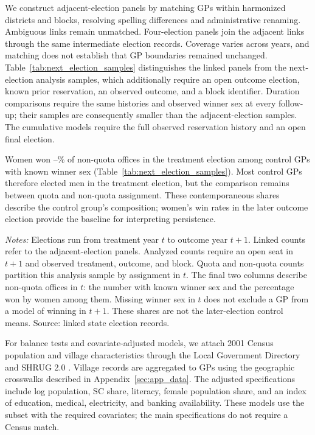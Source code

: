 \documentclass[11pt]{article}
\begin{document}
We construct adjacent-election panels by matching GPs within harmonized districts and blocks, resolving spelling differences and administrative renaming. Ambiguous links remain unmatched. Four-election panels join the adjacent links through the same intermediate election records. Coverage varies across years, and matching does not establish that GP boundaries remained unchanged. Table~\ref{tab:next_election_samples} distinguishes the linked panels from the next-election analysis samples, which additionally require an open outcome election, known prior reservation, an observed outcome, and a block identifier. Duration comparisons require the same histories and observed winner sex at every follow-up; their samples are consequently smaller than the adjacent-election samples. The cumulative models require the full observed reservation history and an open final election.

Women won \controlPriorWomenMin{}--\controlPriorWomenMax{}\% of non-quota offices in the treatment election among control GPs with known winner sex (Table~\ref{tab:next_election_samples}). Most control GPs therefore elected men in the treatment election, but the comparison remains between quota and non-quota assignment. These contemporaneous shares describe the control group's composition; women's win rates in the later outcome election provide the baseline for interpreting persistence.

\begin{table}[!htbp]
\centering\small
\caption{Next-election samples and women elected without quotas}
\label{tab:next_election_samples}

\begin{minipage}{\textwidth}\footnotesize
\emph{Notes:} Elections run from treatment year $t$ to outcome year $t+1$. Linked counts refer to the adjacent-election panels. Analyzed counts require an open seat in $t+1$ and observed treatment, outcome, and block. Quota and non-quota counts partition this analysis sample by assignment in $t$. The final two columns describe non-quota offices in $t$: the number with known winner sex and the percentage won by women among them. Missing winner sex in $t$ does not exclude a GP from a model of winning in $t+1$. These shares are not the later-election control means. Source: linked state election records.
\end{minipage}
\end{table}

For balance tests and covariate-adjusted models, we attach 2001 Census population and village characteristics through the Local Government Directory and SHRUG 2.0 \citep{asher2019socioeconomic, pcindia}. Village records are aggregated to GPs using the geographic crosswalks described in Appendix~\ref{sec:app_data}. The adjusted specifications include log population, SC share, literacy, female population share, and an index of education, medical, electricity, and banking availability. These models use the subset with the required covariates; the main specifications do not require a Census match.
\end{document}
